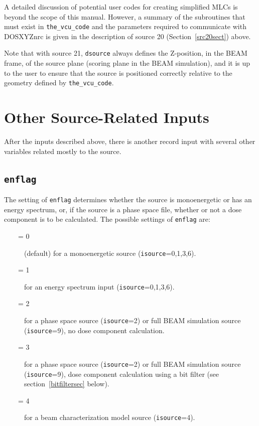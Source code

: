\documentclass[12pt,twoside]{article}      %
\newcommand{\indexm}[1]{\index{#1}}
\begin{document}
A detailed discussion of potential user codes for creating simplified MLCs is beyond the scope of this manual.  However,
a summary of the subroutines that must exist in {\tt the\_vcu\_code} and the parameters required to communicate
with DOSXYZnrc is given in the description of source 20 (Section~\ref{src20sect}) above.

Note that with source 21, {\tt dsource} always defines the Z-position, in the BEAM frame, of the source plane (scoring plane in the BEAM simulation), and
it is up to the user to ensure that the source is positioned correctly relative to the geometry
defined by {\tt the\_vcu\_code}.


\rfoot[{\sffamily \rightmark}]{{\sffamily \leftmark}}

\section{Other Source-Related Inputs}
\label{sec5}
After the inputs described above, there is another record input with
several other variables related mostly to the source.

\indexm{enflag}
\subsection {{\tt enflag}}
\label{enflag_sect}
The setting of {\tt enflag} determines whether the source is monoenergetic
or has an energy spectrum, or, if the source is a phase space file, whether
or not a dose component is to be calculated.
The possible settings of {\tt enflag} are:
\begin{description}
\item [~~~~= 0] (default) for a monoenergetic source ({\tt isource}=0,1,3,6).
\item [~~~~= 1] for an energy spectrum input ({\tt isource}=0,1,3,6).
\item [~~~~= 2] for a phase space source ({\tt isource}=2) or
full BEAM simulation source ({\tt isource}=9), no dose component
calculation.
\item [~~~~= 3] for a phase space source ({\tt isource}=2) or
full BEAM simulation source ({\tt isource}=9), dose component
calculation using a bit filter (see section~\ref{bitfiltersec} below).
\item [~~~~= 4] for a beam characterization model source ({\tt isource}=4).
\end{description}
\end{document}

